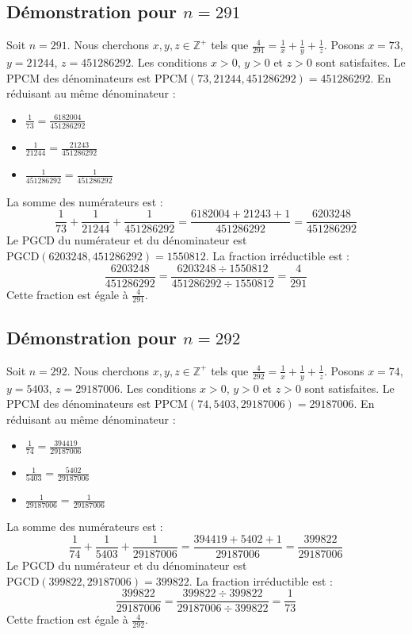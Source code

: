 \documentclass[11pt,a4paper]{article}
\begin{document}
\subsection{Démonstration pour $n = 291$}
Soit $n = 291$. Nous cherchons $x, y, z \in \mathbb{Z}^{+}$ tels que $\frac{4}{291} = \frac{1}{x} + \frac{1}{y} + \frac{1}{z}$.
Posons $x = 73$, $y = 21244$, $z = 451286292$.
Les conditions $x > 0$, $y > 0$ et $z > 0$ sont satisfaites.
Le PPCM des dénominateurs est $\text{PPCM}(73, 21244, 451286292) = 451286292$.
En réduisant au même dénominateur :
\begin{itemize}
    \item $\frac{1}{73} = \frac{6182004}{451286292}$
    \item $\frac{1}{21244} = \frac{21243}{451286292}$
    \item $\frac{1}{451286292} = \frac{1}{451286292}$
\end{itemize}
La somme des numérateurs est :
$$ \frac{1}{73} + \frac{1}{21244} + \frac{1}{451286292} = \frac{6182004 + 21243 + 1}{451286292} = \frac{6203248}{451286292} $$
Le PGCD du numérateur et du dénominateur est $\text{PGCD}(6203248, 451286292) = 1550812$.
La fraction irréductible est :
$$ \frac{6203248}{451286292} = \frac{6203248 \div 1550812}{451286292 \div 1550812} = \frac{4}{291} $$
Cette fraction est égale à $\frac{4}{291}$.

\subsection{Démonstration pour $n = 292$}
Soit $n = 292$. Nous cherchons $x, y, z \in \mathbb{Z}^{+}$ tels que $\frac{4}{292} = \frac{1}{x} + \frac{1}{y} + \frac{1}{z}$.
Posons $x = 74$, $y = 5403$, $z = 29187006$.
Les conditions $x > 0$, $y > 0$ et $z > 0$ sont satisfaites.
Le PPCM des dénominateurs est $\text{PPCM}(74, 5403, 29187006) = 29187006$.
En réduisant au même dénominateur :
\begin{itemize}
    \item $\frac{1}{74} = \frac{394419}{29187006}$
    \item $\frac{1}{5403} = \frac{5402}{29187006}$
    \item $\frac{1}{29187006} = \frac{1}{29187006}$
\end{itemize}
La somme des numérateurs est :
$$ \frac{1}{74} + \frac{1}{5403} + \frac{1}{29187006} = \frac{394419 + 5402 + 1}{29187006} = \frac{399822}{29187006} $$
Le PGCD du numérateur et du dénominateur est $\text{PGCD}(399822, 29187006) = 399822$.
La fraction irréductible est :
$$ \frac{399822}{29187006} = \frac{399822 \div 399822}{29187006 \div 399822} = \frac{1}{73} $$
Cette fraction est égale à $\frac{4}{292}$.
\end{document}
